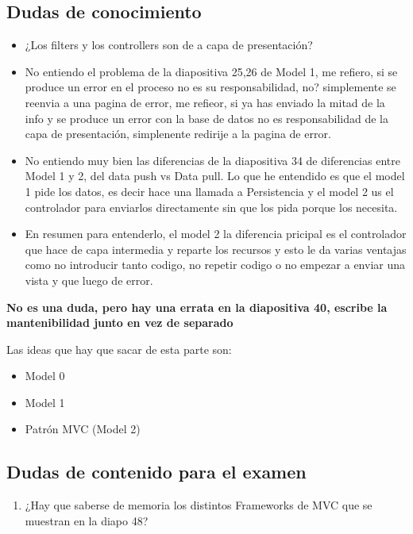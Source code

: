 \subsection*{Dudas de conocimiento}
\begin{itemize}
    \item ¿Los filters y los controllers son de a capa de presentación?
    \item No entiendo el problema de la diapositiva 25,26 de Model 1, me refiero, si se produce un error en el proceso no es su responsabilidad, no? simplemente se reenvia a una pagina de error, me refieor, si ya has enviado la mitad de la info y se produce un error con la base de datos no es responsabilidad de la capa de presentación, simplenente redirije a la pagina de error.
    \item No entiendo muy bien las diferencias de la diapositiva 34 de diferencias entre Model 1 y 2, del data push vs Data pull. Lo que he entendido es que el model 1 pide los datos, es decir hace una llamada a Persistencia y el model 2 us el controlador para enviarlos directamente sin que los pida porque los necesita. 
    \item En resumen para entenderlo, el model 2 la diferencia pricipal es el controlador que hace de capa intermedia y reparte los recursos y esto le da varias ventajas como no introducir tanto codigo, no repetir codigo o no empezar a enviar una vista y que luego de error. 
\end{itemize}

\textbf{No es una duda, pero hay una errata en la diapositiva 40, escribe la mantenibilidad junto en vez de separado}

Las ideas que hay que sacar de esta parte son:
\begin{itemize}
    \item  Model 0
    \item Model 1
    \item Patrón MVC (Model 2)
\end{itemize}

\subsection*{Dudas de contenido para el examen}

\begin{enumerate}
    \item ¿Hay que saberse de memoria los distintos Frameworks de MVC que se muestran en la diapo 48?
\end{enumerate}

